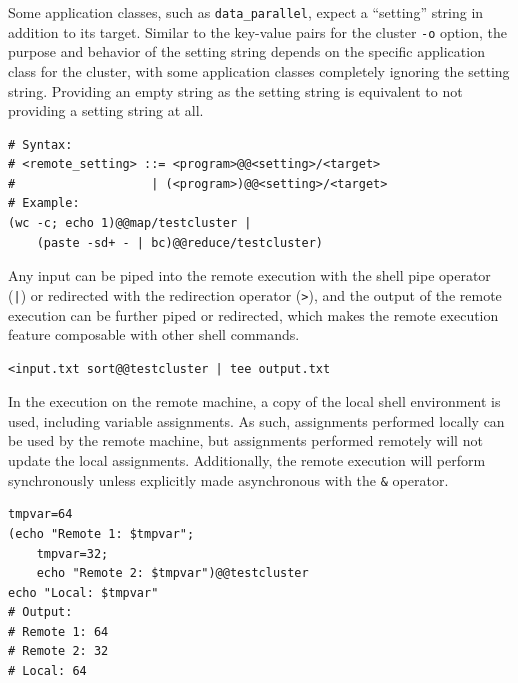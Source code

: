 \documentclass[twoside]{report}
\begin{document}
Some application classes, such as \texttt{data\_parallel}, expect a ``setting'' string in addition to its target.
Similar to the key-value pairs for the cluster \texttt{-o} option, the purpose and behavior of the setting string depends on the specific application class for the cluster, with some application classes completely ignoring the setting string.
Providing an empty string as the setting string is equivalent to not providing a setting string at all.

\begin{minipage}[c]{\textwidth-15pt}
  \begin{lstlisting}[language=Shard]
# Syntax:
# <remote_setting> ::= <program>@@<setting>/<target>
#                   | (<program>)@@<setting>/<target>
# Example:
(wc -c; echo 1)@@map/testcluster |
    (paste -sd+ - | bc)@@reduce/testcluster)
\end{lstlisting}
  \smallskip
\end{minipage}

Any input can be piped into the remote execution with the shell pipe operator (\texttt{|}) or redirected with the redirection operator (\texttt{>}), and the output of the remote execution can be further piped or redirected, which makes the remote execution feature composable with other shell commands.

\begin{minipage}[c]{\textwidth-15pt}
  \begin{lstlisting}[language=Shard]
<input.txt sort@@testcluster | tee output.txt
\end{lstlisting}
  \smallskip
\end{minipage}

In the execution on the remote machine, a copy of the local shell environment is used, including variable assignments.
As such, assignments performed locally can be used by the remote machine, but assignments performed remotely will not update the local assignments.
Additionally, the remote execution will perform synchronously unless explicitly made asynchronous with the \texttt{\&} operator.

\begin{minipage}[c]{\textwidth-15pt}
  \begin{lstlisting}[language=Shard]
tmpvar=64
(echo "Remote 1: $tmpvar";
    tmpvar=32;
    echo "Remote 2: $tmpvar")@@testcluster
echo "Local: $tmpvar"
# Output:
# Remote 1: 64
# Remote 2: 32
# Local: 64
\end{lstlisting}
  \smallskip
\end{minipage}
\end{document}

